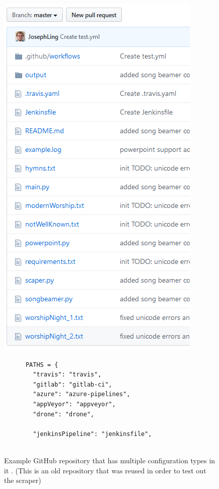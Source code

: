 \documentclass[10pt,conference]{IEEEtran}
\begin{document}
\begin{figure}[!htbp]
  \centering
  \begin{minipage}{.48\textwidth}
    \centering
    \includegraphics[scale=0.5]{repository file system.png}
    
    \caption[alt text]{Example GitHub repository that has multiple configuration types in it \cite{GithubRepoExample}. (This is an old repository that was reused in order to test out the scraper)}
    \label{image_example_repo}
  \end{minipage}%
  \hfill
  \begin{minipage}{.48\textwidth}
    \begin{verbatim}
      PATHS = {
        "travis": "travis",
        "gitlab": "gitlab-ci",
        "azure": "azure-pipelines",
        "appVeyor": "appveyor",
        "drone": "drone",
    
        "jenkinsPipeline": "jenkinsfile",
        

\end{verbatim}
\end{minipage}
\end{figure}
\end{document}
